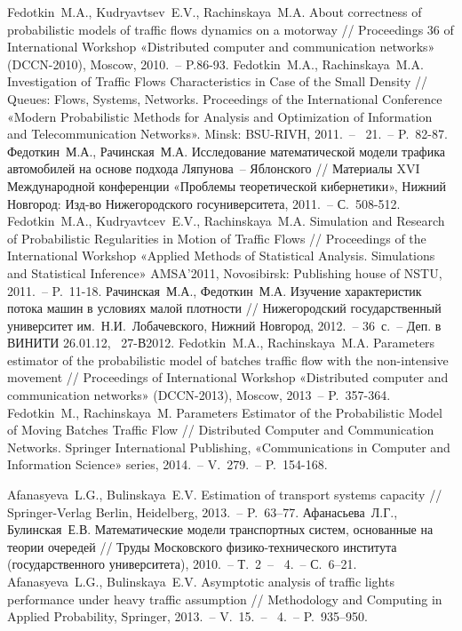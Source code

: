 \documentclass[a4paper,12pt,russian]{extarticle}
\newcommand{\No}{\textnumero}
\begin{document}
\begin{thebibliography}{99}
 Fedotkin~M.A., Kudryavtsev~E.V., Rachinskaya~M.A.  About correctness of probabilistic models of traffic flows dynamics on a motorway // Proceedings 36 of International Workshop «Distributed computer and communication networks» (DCCN-2010), Moscow, 2010.~-- P.86-93.
 Fedotkin~M.A., Rachinskaya~M.A. Investigation of Traffic Flows Characteristics in Case of the Small Density // Queues: Flows, Systems, Networks. Proceedings of the International Conference «Modern Probabilistic Methods for Analysis and Optimization of Information and Telecommunication Networks». Minsk: BSU-RIVH, 2011.~-- \No{}~21.~-- P.~82-87.
 Федоткин~М.А., Рачинская~М.А. Исследование математической модели трафика автомобилей на основе подхода Ляпунова~-- Яблонского // Материалы XVI Международной конференции «Проблемы теоретической кибернетики», Нижний Новгород: Изд-во Нижегородского госуниверситета, 2011.~-- С.~508-512.
 Fedotkin~M.A., Kudryavtcev~E.V., Rachinskaya~M.A. Simulation and Research of Probabilistic Regularities in Motion of Traffic Flows // Proceedings of the International Workshop «Applied Methods of Statistical Analysis. Simulations and
Statistical Inference» AMSA’2011, Novosibirsk: Publishing house of NSTU, 2011.~-- P.~11-18.
 Рачинская~М.А., Федоткин~М.А. Изучение характеристик потока машин в условиях малой плотности // Нижегородский государственный университет им.~Н.И.~Лобачевского, Нижний Новгород, 2012.~-- 36~с.~-- Деп. в ВИНИТИ 26.01.12, \No{}~27-В2012.
 Fedotkin~M.A., Rachinskaya~M.A. Parameters estimator of the probabilistic model of batches traffic flow with the non-intensive movement // Proceedings of International Workshop «Distributed computer and communication networks» (DCCN-2013), Moscow, 2013~-- P.~357-364.
 Fedotkin~M., Rachinskaya~M. Parameters Estimator of the Probabilistic Model of Moving Batches Traffic Flow // Distributed Computer and Communication Networks. Springer International Publishing, «Communications in Computer and Information Science» series, 2014.~-- V.~279.~-- P.~154-168.

 Afanasyeva~L.G., Bulinskaya~E.V. Estimation of transport systems capacity // Springer-Verlag Berlin, Heidelberg, 2013.~-- P.~63–77.
 Афанасьева~Л.Г., Булинская~Е.В. Математические модели транспортных систем, основанные на теории очередей // Труды Московского физико-технического института (государственного университета), 2010.~-- Т.~2~-- \No{}~4.~-- С.~6–21.
 Afanasyeva~L.G., Bulinskaya~E.V. Asymptotic analysis of traffic lights performance under heavy traffic assumption // Methodology and Computing in Applied Probability, Springer, 2013.~-- V.~15.~-- \No{}~4.~-- P.~935–950.


\end{thebibliography}
\end{document}
